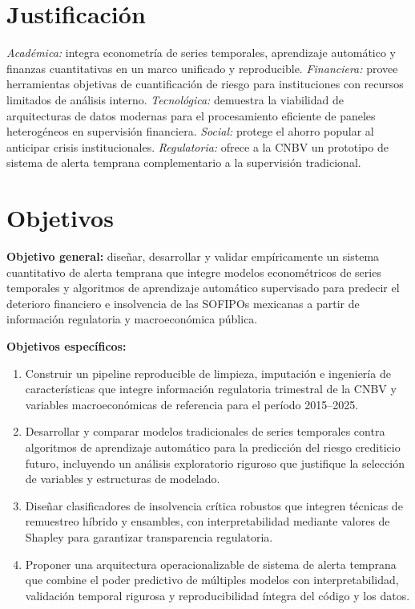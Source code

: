 \section{Justificación}
\textit{Académica:} integra econometría de series temporales, aprendizaje automático y finanzas cuantitativas en un marco unificado y reproducible. \textit{Financiera:} provee herramientas objetivas de cuantificación de riesgo para instituciones con recursos limitados de análisis interno. \textit{Tecnológica:} demuestra la viabilidad de arquitecturas de datos modernas para el procesamiento eficiente de paneles heterogéneos en supervisión financiera. \textit{Social:} protege el ahorro popular al anticipar crisis institucionales. \textit{Regulatoria:} ofrece a la CNBV un prototipo de sistema de alerta temprana complementario a la supervisión tradicional.

\section{Objetivos}
\textbf{Objetivo general:} diseñar, desarrollar y validar empíricamente un sistema cuantitativo de alerta temprana que integre modelos econométricos de series temporales y algoritmos de aprendizaje automático supervisado para predecir el deterioro financiero e insolvencia de las SOFIPOs mexicanas a partir de información regulatoria y macroeconómica pública.

\textbf{Objetivos específicos:}
\begin{enumerate}
    \item Construir un pipeline reproducible de limpieza, imputación e ingeniería de características que integre información regulatoria trimestral de la CNBV y variables macroeconómicas de referencia para el período 2015--2025.
    \item Desarrollar y comparar modelos tradicionales de series temporales contra algoritmos de aprendizaje automático para la predicción del riesgo crediticio futuro, incluyendo un análisis exploratorio riguroso que justifique la selección de variables y estructuras de modelado.
    \item Diseñar clasificadores de insolvencia crítica robustos que integren técnicas de remuestreo híbrido y ensambles, con interpretabilidad mediante valores de Shapley para garantizar transparencia regulatoria.
    \item Proponer una arquitectura operacionalizable de sistema de alerta temprana que combine el poder predictivo de múltiples modelos con interpretabilidad, validación temporal rigurosa y reproducibilidad íntegra del código y los datos.
\end{enumerate}

